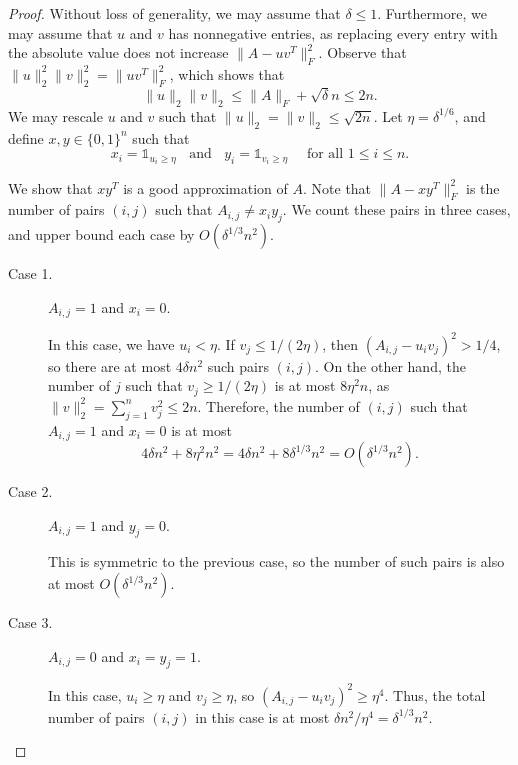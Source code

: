 \documentclass[11pt]{article}
\theoremstyle{plain}
\theoremstyle{definition}
\begin{document}
\begin{proof}
    Without loss of generality, we may assume that $\delta\leq 1$. 
    Furthermore, we may assume that $u$ and $v$ has nonnegative entries, as replacing every entry with the absolute value does not increase $\|A-uv^T\|_F^2$. 
    Observe that $\|u\|_2^2\|v\|_2^2=\|uv^T\|_F^2$, which shows that $$\|u\|_2\|v\|_2\leq \|A\|_F+\sqrt{\delta}n\leq 2n.$$
    We may rescale $u$ and $v$ such that $\|u\|_2=\|v\|_2\leq \sqrt{2n}$. 
    Let $\eta=\delta^{1/6}$, and define $x,y\in \{0,1\}^n$ such that 
    $$
        x_i=\mathds{1}_{u_i \ge \eta}
        \;\;\text{ and }\;\;
        y_i=\mathds{1}_{v_i \ge \eta}
        \quad \text{ for all } 1 \le i \le n.
    $$
 
     We show that $xy^T$ is a good approximation of $A$. 
     Note that $\|A-xy^T\|_F^2$ is the number of pairs $(i,j)$ such that $A_{i,j}\neq x_iy_j$. 
     We count these pairs in three cases, and upper bound each case by $O(\delta^{1/3}n^2)$.
 \begin{description}
     \item[Case 1.] $A_{i,j}=1$ and $x_i=0$.

     In this case, we have $u_i< \eta$. If $v_j\leq 1/(2\eta)$, then $(A_{i,j}-u_iv_j)^2>1/4$, so there are at most $4\delta n^2$ such pairs $(i,j)$. On the other hand, the number of $j$ such that $v_j\geq 1/(2\eta)$ is at most $8\eta^2 n$, as $\|v\|_2^2=\sum_{j=1}^nv_j^2\leq 2n$. Therefore, the number of $(i,j)$ such that $A_{i,j}=1$ and $x_i=0$ is at most $$4\delta n^2+8\eta^2n^2=4\delta n^2+8\delta^{1/3}n^2=O(\delta^{1/3}n^2).$$

    \item[Case 2.] $A_{i,j}=1$ and $y_j=0$.
    
    This is symmetric to the previous case, so the number of such pairs is also at most $O(\delta^{1/3}n^2)$.
     
     \item[Case 3.] $A_{i,j}=0$ and $x_i=y_j=1$.

     In this case, $u_i\geq \eta$ and $v_j\geq \eta$, so $(A_{i,j}-u_iv_j)^2\geq \eta^4$. Thus, the total number of pairs $(i,j)$ in this case is at most $\delta n^2/\eta^4=\delta^{1/3}n^2$.\qedhere
 \end{description}
\end{proof}
\end{document}
